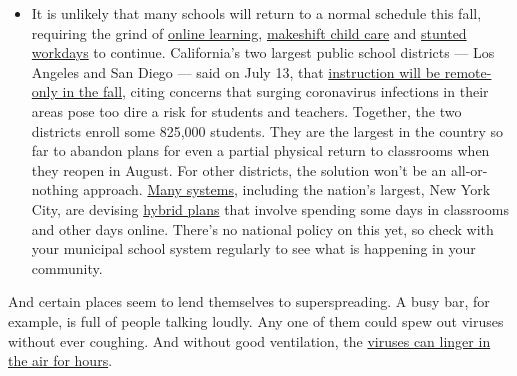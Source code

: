 \begin{itemize}
  \begin{itemize}
  \tightlist
  \item
    It is unlikely that many schools will return to a normal schedule
    this fall, requiring the grind of
    \href{https://www.nytimes.com/2020/06/05/us/coronavirus-education-lost-learning.html?action=click\&pgtype=Article\&state=default\&region=MAIN_CONTENT_3\&context=storylines_faq}{online
    learning},
    \href{https://www.nytimes.com/2020/05/29/us/coronavirus-child-care-centers.html?action=click\&pgtype=Article\&state=default\&region=MAIN_CONTENT_3\&context=storylines_faq}{makeshift
    child care} and
    \href{https://www.nytimes.com/2020/06/03/business/economy/coronavirus-working-women.html?action=click\&pgtype=Article\&state=default\&region=MAIN_CONTENT_3\&context=storylines_faq}{stunted
    workdays} to continue. California's two largest public school
    districts --- Los Angeles and San Diego --- said on July 13, that
    \href{https://www.nytimes.com/2020/07/13/us/lausd-san-diego-school-reopening.html?action=click\&pgtype=Article\&state=default\&region=MAIN_CONTENT_3\&context=storylines_faq}{instruction
    will be remote-only in the fall}, citing concerns that surging
    coronavirus infections in their areas pose too dire a risk for
    students and teachers. Together, the two districts enroll some
    825,000 students. They are the largest in the country so far to
    abandon plans for even a partial physical return to classrooms when
    they reopen in August. For other districts, the solution won't be an
    all-or-nothing approach.
    \href{https://bioethics.jhu.edu/research-and-outreach/projects/eschool-initiative/school-policy-tracker/}{Many
    systems}, including the nation's largest, New York City, are
    devising
    \href{https://www.nytimes.com/2020/06/26/us/coronavirus-schools-reopen-fall.html?action=click\&pgtype=Article\&state=default\&region=MAIN_CONTENT_3\&context=storylines_faq}{hybrid
    plans} that involve spending some days in classrooms and other days
    online. There's no national policy on this yet, so check with your
    municipal school system regularly to see what is happening in your
    community.
  \end{itemize}
\end{itemize}

And certain places seem to lend themselves to superspreading. A busy
bar, for example, is full of people talking loudly. Any one of them
could spew out viruses without ever coughing. And without good
ventilation, the
\href{https://www.nytimes.com/2020/07/04/health/239-experts-with-one-big-claim-the-coronavirus-is-airborne.html}{viruses
can linger in the air for hours}.

